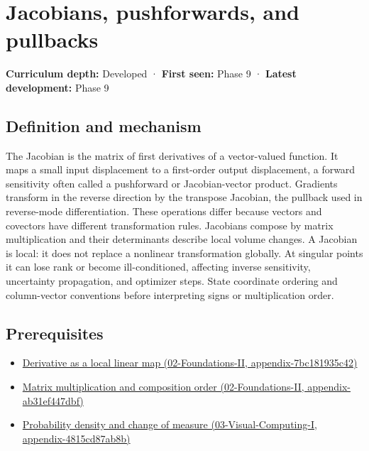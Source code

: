 \hypertarget{appendix-d8a7ddb675eb}{}
\section{Jacobians, pushforwards, and pullbacks}\label{appendix-d8a7ddb675eb-jacobians-pushforwards-and-pullbacks}

\textbf{Curriculum depth:} Developed · \textbf{First seen:} Phase 9 · \textbf{Latest development:} Phase 9

\subsection{Definition and mechanism}\label{appendix-d8a7ddb675eb-definition-and-mechanism}

The Jacobian is the matrix of first derivatives of a vector-valued function. It maps a small input displacement to a first-order output displacement, a forward sensitivity often called a pushforward or Jacobian-vector product. Gradients transform in the reverse direction by the transpose Jacobian, the pullback used in reverse-mode differentiation. These operations differ because vectors and covectors have different transformation rules. Jacobians compose by matrix multiplication and their determinants describe local volume changes. A Jacobian is local: it does not replace a nonlinear transformation globally. At singular points it can lose rank or become ill-conditioned, affecting inverse sensitivity, uncertainty propagation, and optimizer steps. State coordinate ordering and column-vector conventions before interpreting signs or multiplication order.

\subsection{Prerequisites}\label{appendix-d8a7ddb675eb-prerequisites}

\begin{itemize}
\tightlist
\item
  \href{../02-Foundations-II/main.pdf\#nameddest=appendix-7bc181935c42}{Derivative as a local linear map (02-Foundations-II, appendix-7bc181935c42)}
\item
  \href{../02-Foundations-II/main.pdf\#nameddest=appendix-ab31ef447dbf}{Matrix multiplication and composition order (02-Foundations-II, appendix-ab31ef447dbf)}
\item
  \href{../03-Visual-Computing-I/main.pdf\#nameddest=appendix-4815cd87ab8b}{Probability density and change of measure (03-Visual-Computing-I, appendix-4815cd87ab8b)}
\end{itemize}

